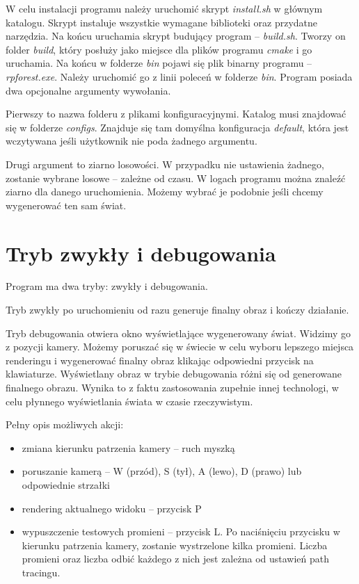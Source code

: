 \documentclass[inz,longabstract]{iithesis}
\begin{document}
        
        W celu instalacji programu należy uruchomić skrypt \textit{install.sh} w głównym katalogu. Skrypt instaluje wszystkie wymagane biblioteki oraz przydatne narzędzia. Na końcu uruchamia skrypt budujący program -- \textit{build.sh}. Tworzy on folder \textit{build}, który posłuży jako miejsce dla plików programu \textit{cmake} i go uruchamia. Na końcu w folderze \textit{bin} pojawi się plik binarny programu -- \textit{rpforest.exe}. Należy uruchomić go z linii poleceń w folderze \textit{bin}. Program posiada dwa opcjonalne argumenty wywołania. 
        
        Pierwszy to nazwa folderu z plikami konfiguracyjnymi. Katalog musi znajdować się w folderze \textit{configs}. Znajduje się tam domyślna konfiguracja \textit{default}, która jest wczytywana jeśli użytkownik nie poda żadnego argumentu. 
        
        Drugi argument to ziarno losowości. W przypadku nie ustawienia żadnego, zostanie wybrane losowe -- zależne od czasu. W logach programu można znaleźć ziarno dla danego uruchomienia. Możemy wybrać je podobnie jeśli chcemy wygenerować ten sam świat. 
    
    \section{Tryb zwykły i debugowania}
        Program ma dwa tryby: zwykły i debugowania. 
        
        Tryb zwykły po uruchomieniu od razu generuje finalny obraz i kończy działanie. 
        
        Tryb debugowania otwiera okno wyświetlające wygenerowany świat. Widzimy go z pozycji kamery. Możemy poruszać się w świecie w celu wyboru lepszego miejsca renderingu i wygenerować finalny obraz klikając odpowiedni przycisk na klawiaturze. Wyświetlany obraz w trybie debugowania różni się od generowane finalnego obrazu. Wynika to z faktu zastosowania zupełnie innej technologi, w celu płynnego wyświetlania świata w czasie rzeczywistym.
        
        Pełny opis możliwych akcji:
        \begin{itemize}
            \item zmiana kierunku patrzenia kamery -- ruch myszką
            \item poruszanie kamerą -- W (przód), S (tył), A (lewo), D (prawo) lub odpowiednie strzałki
            \item rendering aktualnego widoku -- przycisk P
            \item wypuszczenie testowych promieni -- przycisk L. Po naciśnięciu przycisku w kierunku patrzenia kamery, zostanie wystrzelone kilka promieni. Liczba promieni oraz liczba odbić każdego z nich jest zależna od ustawień path tracingu.
        \end{itemize}
        
\end{document}
